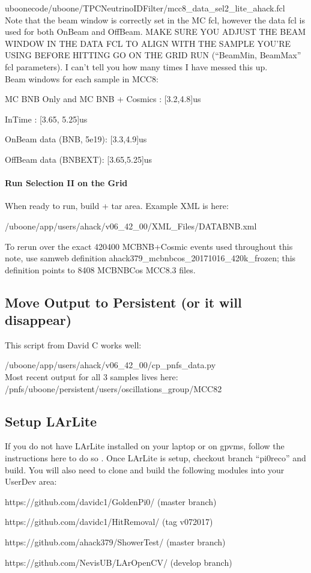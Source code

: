 \documentclass{article}
\begin{document}
\par uboonecode/uboone/TPCNeutrinoIDFilter/mcc8\_data\_sel2\_lite\_ahack.fcl\\

\noindent Note that the beam window is correctly set in the MC fcl, however the data fcl is used for both OnBeam and OffBeam. MAKE SURE YOU ADJUST THE BEAM WINDOW IN THE DATA FCL TO ALIGN WITH THE SAMPLE YOU’RE USING BEFORE HITTING GO ON THE GRID RUN (“BeamMin, BeamMax” fcl parameters).  I can't tell you how many times I have messed this up.\\

\noindent Beam windows for each sample in MCC8:
\par MC BNB Only and MC BNB + Cosmics : [3.2,4.8]us
\par InTime : [3.65, 5.25]us
\par OnBeam data (BNB, 5e19): [3.3,4.9]us
\par OffBeam data (BNBEXT): [3.65,5.25]us 
\paragraph{Run Selection II on the Grid}
\noindent When ready to run, build + tar area.  Example XML is here:

\par /uboone/app/users/ahack/v06\_42\_00/XML\_Files/DATABNB.xml 

\noindent To rerun over the exact 420400 MCBNB+Cosmic events used throughout this note, use samweb definition ahack379\_mcbnbcos\_20171016\_420k\_frozen; this definition points to 8408 MCBNBCos MCC8.3 files.

\subsection{Move Output to Persistent (or it will disappear)} 
This script from David C works well: 
\par /uboone/app/users/ahack/v06\_42\_00/cp\_pnfs\_data.py\\

\noindent Most recent output for all 3 samples lives here:\\
/pnfs/uboone/persistent/users/oscillations\_group/MCC82

\subsection{Setup LArLite}
If you do not have LArLite installed on your laptop or on gpvms, follow the instructions here to do so \cite{bib:larlite}.  
\noindent Once LArLite is setup, checkout branch ``pi0reco'' and build. You will also need to clone and build the following modules into your UserDev area:
\par https://github.com/davidc1/GoldenPi0/ (master branch)
\par https://github.com/davidc1/HitRemoval/ (tag v072017)
\par https://github.com/ahack379/ShowerTest/ (master branch)
\par https://github.com/NevisUB/LArOpenCV/ (develop branch)
\end{document}
